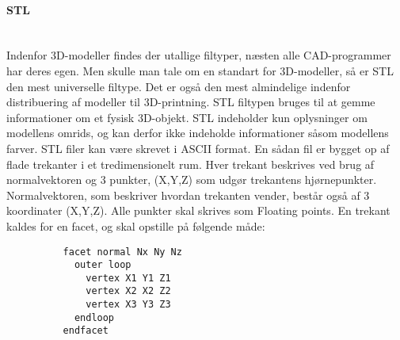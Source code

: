 
\paragraph{STL} \hspace*{\fill} \\%
Indenfor 3D-modeller findes der utallige filtyper, næsten alle CAD-programmer har deres egen. Men skulle man tale om en standart for 3D-modeller, så er STL den mest universelle filtype. Det er også den mest almindelige indenfor distribuering af modeller til 3D-printning. \autocite{makerbot}
STL filtypen bruges til at gemme informationer om et fysisk 3D-objekt. STL indeholder kun oplysninger om modellens omrids, og kan derfor ikke indeholde informationer såsom modellens farver. 
STL filer kan være skrevet i ASCII format. 
En sådan fil er bygget op af flade trekanter i et tredimensionelt rum. 
Hver trekant beskrives ved brug af normalvektoren og 3 punkter, (X,Y,Z) som udgør trekantens hjørnepunkter. Normalvektoren, som beskriver hvordan trekanten vender, består også af 3 koordinater (X,Y,Z). Alle punkter skal skrives som Floating points\autocite{stl}.
En trekant kaldes for en facet, og skal opstille på følgende måde:
\begin{lstlisting}
          facet normal Nx Ny Nz
            outer loop
              vertex X1 Y1 Z1
              vertex X2 X2 Z2
              vertex X3 Y3 Z3
            endloop
          endfacet
\end{lstlisting}



